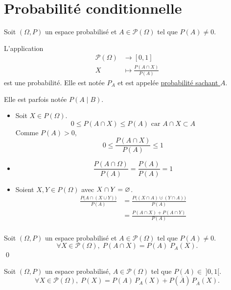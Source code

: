 \part{Probabilité conditionnelle}

\begin{prop-defn}
	Soit $(\Omega, P)$ un espace probabilisé et $A \in \mathcal{P}(\Omega)$ tel que $P(A) \neq 0$.

	L'application \begin{align*}
		\mathcal{P}(\Omega) &\longrightarrow [0,1] \\
		X &\longmapsto \frac{P(A \cap X)}{P(A)}
	\end{align*} est une probabilité. Elle est notée $P_A$ et est appelée \underline{probabilité sachant $A$}. 

	Elle est parfois notée $P(A\mid B)$.
\end{prop-defn}

\begin{prv}
	\begin{itemize}
		\item Soit $X \in P(\Omega)$. \[
				0 \le P(A \cap X) \le P(A) \text{ car } A \cap X \subset A
			\] Comme $P(A) > 0$, \[
				0 \le \frac{P(A \cap X)}{P(A)} \le 1
			\]
		\item \[
				\frac{P(A \cap \Omega)}{P(A)} = \frac{P(A)}{P(A)} = 1
			\]
		\item Soient $X, Y \in P(\Omega)$ avec $X \cap Y = \varnothing$.
			\begin{align*}
				\frac{P\big(A \cap (X \cup Y)\big)}{P(A)} &= \frac{P\big((X \cap A)\cupdot (Y \cap A)\big)}{P(A)}\\
				&= \frac{P(A \cap X) + P(A \cap Y)}{P(A)} \\
			\end{align*}
	\end{itemize}
\end{prv}

\begin{prop}
	Soit $(\Omega, P)$ un espace probabilisé et $A \in \mathcal{P}(\Omega)$ tel que $P(A) \neq 0$. \[
		\forall X \in \mathcal{P}(\Omega),\; P(A \cap X) = P(A)\;P_A(X).
	\] \qed
\end{prop}

\begin{prop}
	Soit $(\Omega, P)$ un espace probabilisé, $A \in \mathcal{P}(\Omega)$ tel que $P(A) \in\; ]0,1[$. \[
		\forall X \in \mathcal{P}(\Omega),\;P(X) = P(A)\,P_A(X) + P\left( \overline{A} \right)\,P_{\overline{A}}(X).
	\]
\end{prop}

